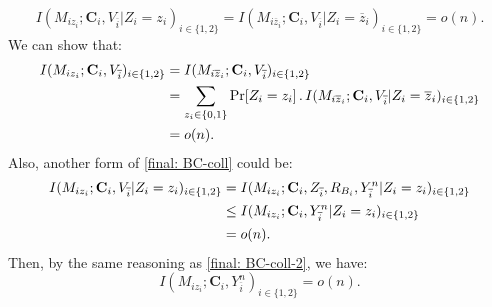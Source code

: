 \documentclass[runningheads]{llncs}
\begin{document}
\begin{equation}\label{final: BC-coll}
    I(M_{i{z}_i};\mathbf{C}_i, V_{\overline{i}}|Z_i = {z}_i)_{i\in\{1,2\}}  = I(M_{i\overline{z}_i};\mathbf{C}_i, V_{\overline{i}}|Z_i = \overline{z}_i)_{i\in\{1,2\}}       = o(n).
\end{equation}
We can show that:
\begin{align}\label{final: BC-coll-2}
    I(M_{i{z}_i};\mathbf{C}_i, V_{\overline{i}})_{i\in\{1,2\}} & = I(M_{i\overline{z}_i};\mathbf{C}_i, V_{\overline{i}})_{i\in\{1,2\}} \notag\\
    & = \sum_{z_i\in\{0,1\}} \text{Pr}[{Z_i = z_i}]\,.\, I(M_{i\overline{z}_i};\mathbf{C}_i, V_{\overline{i}}|Z_i = \overline{z}_i)_{i\in\{1,2\}}\notag\\
    & = o(n).
\end{align}
Also, another form of \eqref{final: BC-coll} could be:
\begin{align}
    I(M_{i{z}_i};\mathbf{C}_i, V_{\overline{i}}|Z_i = {z}_i)_{i\in\{1,2\}} & = I(M_{i{z}_i};\mathbf{C}_i, Z_{\overline{i}}, R_{B_i}, Y_{\overline{i}}^n|Z_i = {z}_i)_{i\in\{1,2\}} \notag\\
    & \leq I(M_{i{z}_i};\mathbf{C}_i, Y_{\overline{i}}^n|Z_i = {z}_i)_{i\in\{1,2\}} \notag\\
    & = o(n).
\end{align}
Then, by the same reasoning as \eqref{final: BC-coll-2}, we have:
\begin{equation}\label{final: BC-coll-3}
     I(M_{i{z}_i};\mathbf{C}_i, Y_{\overline{i}}^n)_{i\in\{1,2\}}  = o(n).
\end{equation}
\end{document}
